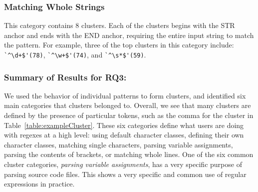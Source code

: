 \subsubsection{ Matching Whole Strings}
This category contains 8 clusters. Each of the clusters begins with the STR anchor and ends with the END anchor, requiring the entire input string to match the pattern. For example, three of the top clusters in this category include:
\verb!`^\d+$'(78)!, \verb!`^\w+$'(74)!, and \verb!`^\s*$'(59)!.



\subsubsection{Summary of Results for RQ3:}
We used the behavior of individual patterns to form clusters, and identified six main categories that clusters belonged to.  Overall, we see that many clusters are defined by the presence of particular tokens, such as the comma for the cluster in Table~\ref{table:exampleCluster}.
These six categories define what users are doing with regexes at a high level: using default character classes, defining their own character classes, matching single characters, parsing variable assignments, parsing the contents of brackets, or matching whole lines.
 One of the six common cluster categories, \emph{parsing variable assignments}, has a very specific purpose of parsing source code files. This shows a very specific and common use of regular expressions in practice.








